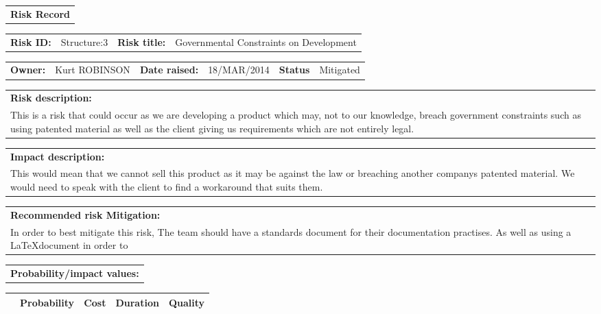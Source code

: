 \begin{table}
	\begin{tabularx}{\textwidth}{| X |}
		\hline
		\textbf{Risk Record} \\
	\end{tabularx}
	\begin{tabularx}{\textwidth}{| l | X | l | X |}
		\hline
		\textbf{Risk ID:} & Structure:3 & \textbf{Risk title:} & Governmental Constraints on Development  \\
	\end{tabularx}
	\begin{tabularx}{\textwidth}{| l | X | l | X | l | X |}
		\hline
		\textbf{Owner:} & Kurt ROBINSON & \textbf{Date raised:} & 18/MAR/2014 & \textbf{Status} & Mitigated \\
	\end{tabularx}
	\begin{tabularx}{\textwidth}{| X |}
		\hline
		\textbf{Risk description:} \\ This is a risk that could occur as we are developing a product which may, not to our knowledge, breach government constraints such as using patented material as well as the client giving us requirements which are not entirely legal. \\
	\end{tabularx}
	\begin{tabularx}{\textwidth}{| X |}
		\hline
		\textbf{Impact description:} \\ This would mean that we cannot sell this product as it may be against the law or breaching another companys patented material. We would need to speak with the client to find a workaround that suits them. \\
	\end{tabularx}
	\begin{tabularx}{\textwidth}{| X |}
		\hline
		\textbf{Recommended risk Mitigation:} \\ In order to best mitigate this risk, The team should have a standards document for their documentation practises. As well as using a \LaTeX document in order to  \\
	\end{tabularx}
	\begin{tabularx}{\textwidth}{| X |}
		\hline
		\textbf{Probability/impact values:} \\
	\end{tabularx}
	\begin{tabularx}{\textwidth}{| l | l | X | X | X |}
		\hline
		 &  \textbf{Probability} & \textbf{Cost} & \textbf{Duration} & \textbf{Quality} \\ \hline

\end{tabularx}
\end{table}
